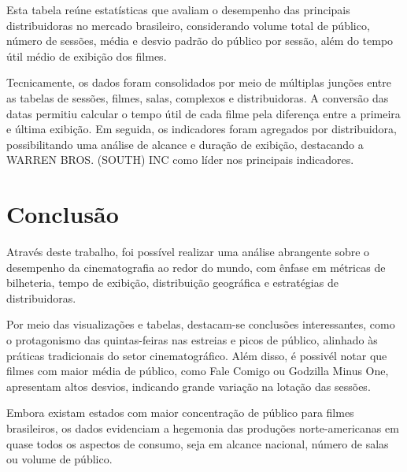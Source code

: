 \documentclass{article}
\begin{document}
Esta tabela reúne estatísticas que avaliam o desempenho das principais distribuidoras no mercado brasileiro, considerando volume total de público, número de sessões, média e desvio padrão do público por sessão, além do tempo útil médio de exibição dos filmes.

Tecnicamente, os dados foram consolidados por meio de múltiplas junções entre as tabelas de sessões, filmes, salas, complexos e distribuidoras. A conversão das datas permitiu calcular o tempo útil de cada filme pela diferença entre a primeira e última exibição. Em seguida, os indicadores foram agregados por distribuidora, possibilitando uma análise de alcance e duração de exibição, destacando a WARREN BROS. (SOUTH) INC como líder nos principais indicadores.


\section*{Conclusão}

Através deste trabalho, foi possível realizar uma análise abrangente sobre o desempenho da cinematografia ao redor do mundo, com ênfase em métricas de bilheteria, tempo de exibição, distribuição geográfica e estratégias de distribuidoras.

Por meio das visualizações e tabelas, destacam-se conclusões interessantes, como o protagonismo das quintas-feiras nas estreias e picos de público, alinhado às práticas tradicionais do setor cinematográfico. Além disso, é possivél notar que filmes com maior média de público, como Fale Comigo ou Godzilla Minus One, apresentam altos desvios, indicando grande variação na lotação das sessões.

Embora existam estados com maior concentração de público para filmes brasileiros, os dados evidenciam a hegemonia das produções norte-americanas em quase todos os aspectos de consumo, seja em alcance nacional, número de salas ou volume de público. 

\pagebreak
\end{document}
